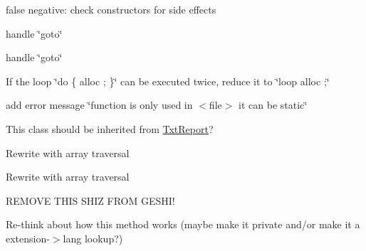 \begin{DoxyRefList}
false negative\-: check constructors for side effects  
\item[\label{todo__todo000040}%
\hypertarget{todo__todo000040}{}%
Member \hyperlink{class_check_memory_leak_in_function_ad5de6453dc31ac22af41b26369bfdce9}{Check\-Memory\-Leak\-In\-Function\-:\-:call\-\_\-func} (const \hyperlink{class_token}{Token} $\ast$tok, std\-::list$<$ const Token $\ast$ $>$ callstack, const unsigned int varid, Alloc\-Type \&alloctype, Alloc\-Type \&dealloctype, bool \&allocpar, unsigned int sz)]handle \char`\"{}goto\char`\"{}  
\item[\label{todo__todo000042}%
\hypertarget{todo__todo000042}{}%
Member \hyperlink{class_check_memory_leak_in_function_a4eefe783ba9711813f40557c3a5d36dd}{Check\-Memory\-Leak\-In\-Function\-:\-:check\-Scope} (const \hyperlink{class_token}{Token} $\ast$\-Tok1, const std\-::string \&varname, unsigned int varid, bool classmember, unsigned int sz)]handle \char`\"{}goto\char`\"{}  
\item[\label{todo__todo000041}%
\hypertarget{todo__todo000041}{}%
Member \hyperlink{class_check_memory_leak_in_function_a0a8ea7cea5f1e0bc1f6857c7348c61c9}{Check\-Memory\-Leak\-In\-Function\-:\-:simplifycode} (\hyperlink{class_token}{Token} $\ast$tok) const ]If the loop \char`\"{}do \{ alloc ; \}\char`\"{} can be executed twice, reduce it to \char`\"{}loop alloc ;\char`\"{}  
\item[\label{todo__todo000049}%
\hypertarget{todo__todo000049}{}%
Member \hyperlink{class_check_unused_functions_ad89f0ddf22cb4eaf861089cd790a1e95}{Check\-Unused\-Functions\-:\-:check} (\hyperlink{class_error_logger}{Error\-Logger} $\ast$const error\-Logger)]add error message \char`\"{}function is only used in $<$file$>$ it can be static\char`\"{}  
\item[\label{todo__todo000001}%
\hypertarget{todo__todo000001}{}%
Class \hyperlink{class_csv_report}{Csv\-Report} ]This class should be inherited from \hyperlink{class_txt_report}{Txt\-Report}?  
\item[\label{todo__todo000009}%
\hypertarget{todo__todo000009}{}%
Member \hyperlink{class_ge_s_hi_ab068cf775d5f11f1002346897d42af08}{Ge\-S\-Hi\-:\-:disable\-\_\-highlighting} ()]Rewrite with array traversal  
\item[\label{todo__todo000010}%
\hypertarget{todo__todo000010}{}%
Member \hyperlink{class_ge_s_hi_a15e3ef2c685ab4a68992641ef30a4761}{Ge\-S\-Hi\-:\-:enable\-\_\-highlighting} (\$flag=true)]Rewrite with array traversal  
\item[\label{todo__todo000013}%
\hypertarget{todo__todo000013}{}%
Member \hyperlink{class_ge_s_hi_a48a36664603935601b203b64fc9cae70}{Ge\-S\-Hi\-:\-:enable\-\_\-important\-\_\-blocks} (\$flag)]R\-E\-M\-O\-V\-E T\-H\-I\-S S\-H\-I\-Z F\-R\-O\-M G\-E\-S\-H\-I!  
\item[\label{todo__todo000011}%
\hypertarget{todo__todo000011}{}%
Member \hyperlink{class_ge_s_hi_aff9441e15e313a587161d6a0a8104622}{Ge\-S\-Hi\-:\-:get\-\_\-language\-\_\-name\-\_\-from\-\_\-extension} (\$extension, \$lookup=array())]Re-\/think about how this method works (maybe make it private and/or make it a extension-\/$>$lang lookup?) 


\end{DoxyRefList}

